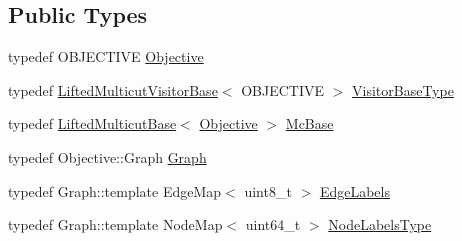 \subsection*{Public Types}
\begin{DoxyCompactItemize}
\item 
typedef O\+B\+J\+E\+C\+T\+I\+V\+E \hyperlink{classnifty_1_1graph_1_1optimization_1_1lifted__multicut_1_1PyLiftedMulticutBase_aebb82b4b2afd6026d12565580f07fac3}{Objective}
\item 
typedef \hyperlink{namespacenifty_1_1graph_1_1optimization_1_1lifted__multicut_a7fba9b4f2086d28c7448955f4af4a0de}{Lifted\+Multicut\+Visitor\+Base}$<$ O\+B\+J\+E\+C\+T\+I\+V\+E $>$ \hyperlink{classnifty_1_1graph_1_1optimization_1_1lifted__multicut_1_1PyLiftedMulticutBase_ac8cdcdeb2751c508a445e4d1a66411f6}{Visitor\+Base\+Type}
\item 
typedef \hyperlink{classnifty_1_1graph_1_1optimization_1_1lifted__multicut_1_1LiftedMulticutBase}{Lifted\+Multicut\+Base}$<$ \hyperlink{classnifty_1_1graph_1_1optimization_1_1lifted__multicut_1_1PyLiftedMulticutBase_aebb82b4b2afd6026d12565580f07fac3}{Objective} $>$ \hyperlink{classnifty_1_1graph_1_1optimization_1_1lifted__multicut_1_1PyLiftedMulticutBase_a71150670969e7a57126b1cece43d62c1}{Mc\+Base}
\item 
typedef Objective\+::\+Graph \hyperlink{classnifty_1_1graph_1_1optimization_1_1lifted__multicut_1_1PyLiftedMulticutBase_a04c18c391285b11a90c1e822fbe8fb51}{Graph}
\item 
typedef Graph\+::template Edge\+Map$<$ uint8\+\_\+t $>$ \hyperlink{classnifty_1_1graph_1_1optimization_1_1lifted__multicut_1_1PyLiftedMulticutBase_ac32a5f5a18cb3ade6b727c4e84791c46}{Edge\+Labels}
\item 
typedef Graph\+::template Node\+Map$<$ uint64\+\_\+t $>$ \hyperlink{classnifty_1_1graph_1_1optimization_1_1lifted__multicut_1_1PyLiftedMulticutBase_aff32f923ac202e928a33e375bf979497}{Node\+Labels\+Type}
\end{DoxyCompactItemize}

